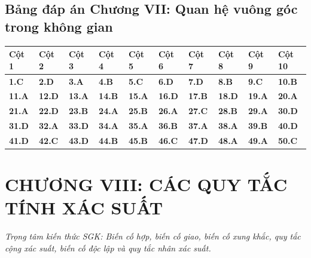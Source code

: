 \documentclass[11pt,a4paper]{article}
\begin{document}
\subsection*{\color{primary} Bảng đáp án Chương VII: Quan hệ vuông góc trong không gian}
\begin{center}
\renewcommand{\arraystretch}{1.25}
\begin{tabularx}{\textwidth}{*{10}{>{\centering\arraybackslash}X}}
\toprule
\textbf{\color{primary} Cột 1} & \textbf{\color{primary} Cột 2} & \textbf{\color{primary} Cột 3} & \textbf{\color{primary} Cột 4} & \textbf{\color{primary} Cột 5} & \textbf{\color{primary} Cột 6} & \textbf{\color{primary} Cột 7} & \textbf{\color{primary} Cột 8} & \textbf{\color{primary} Cột 9} & \textbf{\color{primary} Cột 10} \\
\midrule
\textbf{1.C} & \textbf{2.D} & \textbf{3.A} & \textbf{4.B} & \textbf{5.C} & \textbf{6.D} & \textbf{7.D} & \textbf{8.B} & \textbf{9.C} & \textbf{10.B} \\
\rowcolor{rowtint} \textbf{11.A} & \textbf{12.D} & \textbf{13.A} & \textbf{14.B} & \textbf{15.A} & \textbf{16.D} & \textbf{17.B} & \textbf{18.D} & \textbf{19.A} & \textbf{20.A} \\
\textbf{21.A} & \textbf{22.D} & \textbf{23.B} & \textbf{24.A} & \textbf{25.B} & \textbf{26.A} & \textbf{27.C} & \textbf{28.B} & \textbf{29.A} & \textbf{30.D} \\
\rowcolor{rowtint} \textbf{31.D} & \textbf{32.A} & \textbf{33.D} & \textbf{34.A} & \textbf{35.A} & \textbf{36.B} & \textbf{37.A} & \textbf{38.A} & \textbf{39.B} & \textbf{40.D} \\
\textbf{41.D} & \textbf{42.C} & \textbf{43.D} & \textbf{44.B} & \textbf{45.B} & \textbf{46.C} & \textbf{47.D} & \textbf{48.A} & \textbf{49.A} & \textbf{50.C} \\
\bottomrule
\end{tabularx}
\end{center}\vspace{10pt}
\section*{\color{primary} CHƯƠNG VIII: CÁC QUY TẮC TÍNH XÁC SUẤT}
\textit{Trọng tâm kiến thức SGK: Biến cố hợp, biến cố giao, biến cố xung khắc, quy tắc cộng xác suất, biến cố độc lập và quy tắc nhân xác suất.}\par\vspace{4pt}
\end{document}
